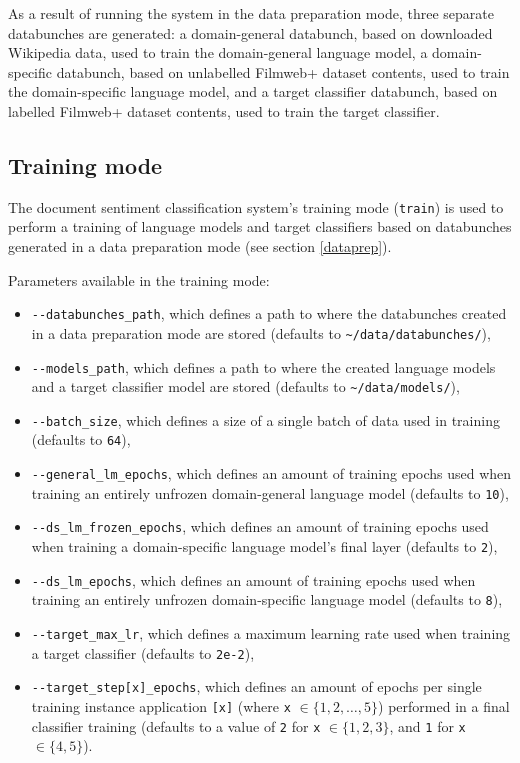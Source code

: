 As a result of running the system in the data preparation mode, three separate databunches are generated: a domain-general databunch, based on downloaded Wikipedia data, used to train the domain-general language model, a domain-specific databunch, based on unlabelled Filmweb+ dataset contents, used to train the domain-specific language model, and a target classifier databunch, based on labelled Filmweb+ dataset contents, used to train the target classifier.

\subsection{Training mode}

The document sentiment classification system's training mode (\lstinline{train}) is used to perform a training of language models and target classifiers based on databunches generated in a data preparation mode (see section \ref{dataprep}).

Parameters available in the training mode:

\begin{itemize}
    \item \lstinline{--databunches_path}, which defines a path to where the databunches created in a data preparation mode are stored (defaults to \lstinline{~/data/databunches/}),
    \item \lstinline{--models_path}, which defines a path to where the created language models and a target classifier model are stored (defaults to \lstinline{~/data/models/}),
    \item \lstinline{--batch_size}, which defines a size of a single batch of data used in training (defaults to \lstinline{64}),
    \item \lstinline{--general_lm_epochs}, which defines an amount of training epochs used when training an entirely unfrozen domain-general language model (defaults to \lstinline{10}),
    \item \lstinline{--ds_lm_frozen_epochs}, which defines an amount of training epochs used when training a domain-specific language model's final layer (defaults to \lstinline{2}),
    \item \lstinline{--ds_lm_epochs}, which defines an amount of training epochs used when training an entirely unfrozen domain-specific language model (defaults to \lstinline{8}),
    \item \lstinline{--target_max_lr}, which defines a maximum learning rate used when training a target classifier (defaults to \lstinline{2e-2}),
    \item \lstinline{--target_step[x]_epochs}, which defines an amount of epochs per single training instance application \lstinline{[x]} (where \lstinline{x} $\in \{1, 2, \dots, 5\}$) performed in a final classifier training (defaults to a value of \lstinline{2} for \lstinline{x} $\in \{1, 2, 3\}$, and \lstinline{1} for \lstinline{x} $\in \{4, 5\}$).
\end{itemize}

